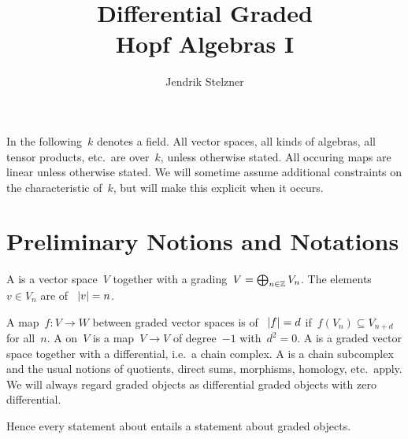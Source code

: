 \documentclass[a4paper,10pt,headings=standardclasses]{scrartcl}
\title{Differential Graded \\ Hopf Algebras I}
\author{Jendrik Stelzner}
\date{}
\begin{document}
\maketitle

In the following~$k$ denotes a field.
All vector spaces, all kinds of algebras, all tensor products, etc.\ are over~$k$, unless otherwise stated.
All occuring maps are linear unless otherwise stated.
We will sometime assume additional constraints on the characteristic of~$k$, but will make this explicit when it occurs.





\section{Preliminary Notions and Notations}

A  is a vector space~$V$ together with a grading~$V = \bigoplus_{n \in \mathbb{Z}} V_n$.
The elements~$v \in V_n$ are  of ~$\lvert v\rvert = n$.
\begin{center}
\end{center}
A map~$f \colon V \to W$ between graded vector spaces is  of ~$\lvert f\rvert = d$ if~$f(V_n) \subseteq V_{n+d}$ for all~$n$.
A  on~$V$ is a map~$V \to V$ of degree~$-1$ with~$d^2 = 0$.
A  is a graded vector space together with a differential, i.e.\ a chain complex.
A {\dgsub} is a chain subcomplex and the usual notions of quotients, direct sums, morphisms, homology, etc.\ apply.
We will always regard graded objects as differential graded objects with zero differential.
\begin{center}
\end{center}
Hence every statement about {\dgos} entails a statement about graded objects.
\end{document}
